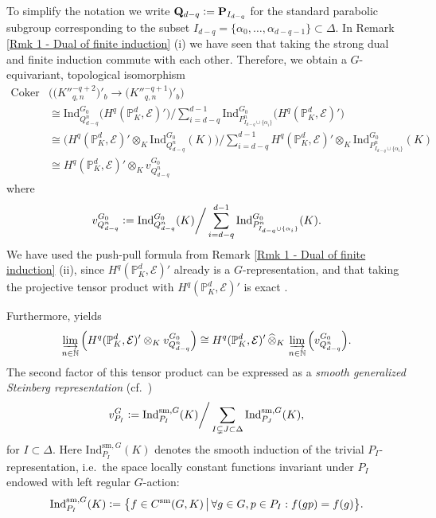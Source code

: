 \documentclass[a4paper, reqno, 10pt]{amsart}
\theoremstyle{definition}
\numberwithin{equation}{section}
\newcommand{\Coker}{{\mathrm{Coker}}}
\newcommand{\cotimes}[1]{{\,\widehat{\otimes}_{#1}\,}}
\newcommand{\defeq}{\vcentcolon=}
\newcommand{\Ind}{{\mathrm{Ind}}}
\newcommand{\ra}{\rightarrow}
\newcommand{\sm}{{\mathrm{sm}}}
\newcommand{\BN}{{\mathbb {N}}}
\newcommand{\BP}{{\mathbb {P}}}
\newcommand{\CE}{{\mathcal {E}}}
\newcommand{\bP}{{\mathrm{\bf P}}}
\newcommand{\bQ}{{\mathrm{\bf Q}}}
\begin{document}
To simplify the notation we write $\bQ_{d-q} \defeq \bP_{I_{d-q}}$ for the standard parabolic subgroup corresponding to the subset $I_{d-q} = \{ \alpha_0, \ldots, \alpha_{d-q-1} \} \subset \Delta$.
In Remark \ref{Rmk 1 - Dual of finite induction} (i) we have seen that taking the strong dual and finite induction commute with each other.
Therefore, we obtain a $G$-equivariant, topological isomorphism
\begin{align*}
	\Coker &\Big( \big(K''^{-q+2}_{q,n}\big)'_b \ra \big(K''^{-q+1}_{q,n}\big)'_b \Big) \\
	&\cong \Ind^{G_0}_{Q^n_{d-q}} \big( H^q (\BP_K^d, \CE)' \big) \bigg/ \sum_{i=d-q}^{d-1} \Ind^{G_0}_{P^n_{I_{d-q} \cup \{\alpha_i\}}} \big( H^q (\BP_K^d, \CE)' \big) \\
	&\cong \Big( H^q (\BP_K^d, \CE)' \otimes_K \Ind^{G_0}_{Q^n_{d-q}} (K)  \Big)  \bigg/ \sum_{i=d-q}^{d-1} H^q (\BP_K^d, \CE)' \otimes_K \Ind^{G_0}_{P^n_{I_{d-q} \cup \{\alpha_i\}}} (K) \\
	&\cong H^q (\BP_K^d, \CE)' \otimes_K  v^{G_0}_{Q^n_{d-q}} 
\end{align*}
where
\begin{equation}\label{Eq 3 - Definition of generalized Steinberg representation for finite level}
	v^{G_0}_{Q^n_{d-q}} \defeq \Ind^{G_0}_{Q^n_{d-q}} (K) \bigg/ \sum_{i=d-q}^{d-1} \Ind^{G_0}_{P^n_{I_{d-q} \cup \{\alpha_i\}}} (K) .
\end{equation}
We have used the push-pull formula from Remark \ref{Rmk 1 - Dual of finite induction} (ii), since $H^q (\BP_K^d, \CE)'$ already is a $G$-representation, and that taking the projective tensor product with $H^q (\BP_K^d, \CE)'$ is exact \cite[Lemma 2.1 (ii)]{BreuilHerzig18TowardsFinSlopePartGLn}.


Furthermore, \cite[Prop.\ 1.1.32 (i)]{Emerton17LocAnVect} yields
\begin{align*}
	\varinjlim_{n\in \BN} \Big( H^q (\BP_K^d, \CE)' \otimes_K  v^{G_0}_{Q^n_{d-q}} \Big)
	\cong H^q (\BP_K^d, \CE)' \cotimes{K} \varinjlim_{n\in \BN} \Big( v^{G_0}_{Q^n_{d-q}}  \Big) .
\end{align*}
The second factor of this tensor product can be expressed as a \textit{smooth generalized Steinberg representation} (cf.\ \cite{Casselman74pAdicVanishingThmGarland})
\begin{equation*}
	v^G_{P_I} \defeq \Ind^{\sm,G}_{P_I} (K) \bigg/ \sum_{I\subsetneq J \subset \Delta} \Ind^{\sm,G}_{P_J} (K) ,
\end{equation*}
for $I \subset \Delta$.
Here $\Ind^{\sm,G}_{P_I}(K)$ denotes the smooth induction of the trivial $P_I$-representation, i.e.\ the space locally constant functions invariant under $P_I$ endowed with left regular $G$-action:
\begin{equation*}
	\Ind^{\sm,G}_{P_I}(K) \defeq \big\{ f\in C^\sm (G,K) \,\big\vert\, \forall g\in G , p \in P_I : f(gp) = f(g) \big\} .
\end{equation*}
\end{document}
